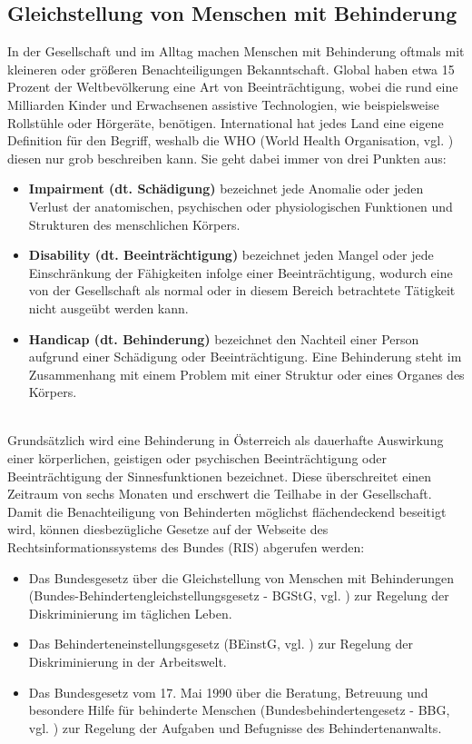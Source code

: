 \subsection{Gleichstellung von Menschen mit Behinderung}
In der Gesellschaft und im Alltag machen Menschen mit Behinderung oftmals mit kleineren oder größeren Benachteiligungen Bekanntschaft. Global haben etwa 15 Prozent der Weltbevölkerung eine Art von Beeinträchtigung, wobei die rund eine Milliarden Kinder und Erwachsenen assistive Technologien, wie beispielsweise Rollstühle oder Hörgeräte, benötigen. International hat jedes Land eine eigene Definition für den Begriff, weshalb die WHO (World Health Organisation, vgl. \cite{who_disability_2011}) diesen nur grob beschreiben kann. Sie geht dabei immer von drei Punkten aus:

\begin{itemize}
    \item \textbf{Impairment (dt. Schädigung)} bezeichnet jede Anomalie oder jeden Verlust der anatomischen, psychischen oder physiologischen Funktionen und Strukturen des menschlichen Körpers.
    \item \textbf{Disability (dt. Beeinträchtigung)} bezeichnet jeden Mangel oder jede Einschränkung der Fähigkeiten infolge einer Beeinträchtigung, wodurch eine von der Gesellschaft als normal oder in diesem Bereich betrachtete Tätigkeit nicht ausgeübt werden kann.
    \item \textbf{Handicap (dt. Behinderung)} bezeichnet den Nachteil einer Person aufgrund einer Schädigung oder Beeinträchtigung. Eine Behinderung steht im Zusammenhang mit einem Problem mit einer Struktur oder eines Organes des Körpers.
\end{itemize}

\mbox{}\\Grundsätzlich wird eine Behinderung in Österreich als dauerhafte Auswirkung einer körperlichen, geistigen oder psychischen Beeinträchtigung oder Beeinträchtigung der Sinnesfunktionen bezeichnet. Diese überschreitet einen Zeitraum von sechs Monaten und erschwert die Teilhabe in der Gesellschaft. Damit die Benachteiligung von Behinderten möglichst flächendeckend beseitigt wird, können diesbezügliche Gesetze auf der Webseite des Rechtsinformationssystems des Bundes (RIS) abgerufen werden:

\begin{itemize}
    \item Das Bundesgesetz über die Gleichstellung von Menschen mit Behinderungen (Bundes-Behindertengleichstellungsgesetz - BGStG, vgl. \cite{ris_bgstg_2020}) zur Regelung der Diskriminierung im täglichen Leben.
    \item Das Behinderteneinstellungsgesetz (BEinstG, vgl. \cite{ris_beinstg_2020}) zur Regelung der Diskriminierung in der Arbeitswelt.
    \item Das Bundesgesetz vom 17. Mai 1990 über die Beratung, Betreuung und besondere Hilfe für behinderte Menschen (Bundesbehindertengesetz - BBG, vgl. \cite{ris_bbg_2020}) zur Regelung der Aufgaben und Befugnisse des Behindertenanwalts.
\end{itemize}

